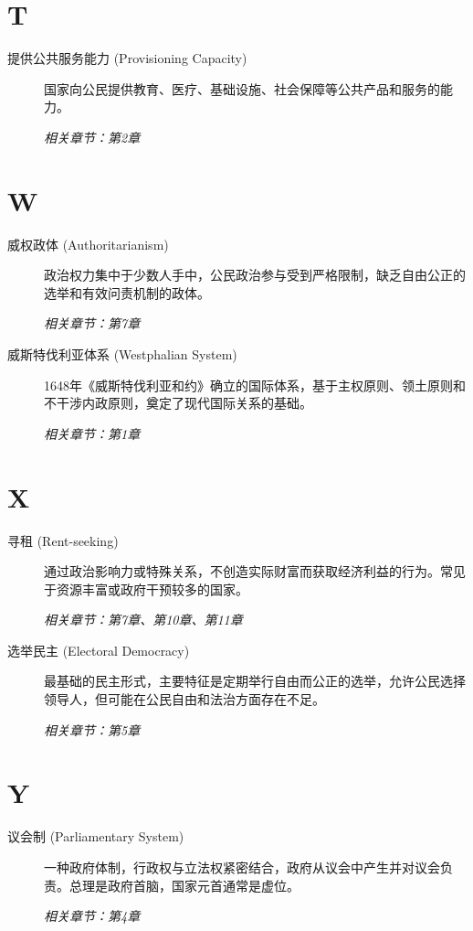\section{T}
\begin{description}
    \item[提供公共服务能力 (Provisioning Capacity)] 国家向公民提供教育、医疗、基础设施、社会保障等公共产品和服务的能力。 \par\textit{相关章节：第2章}
\end{description}

\section{W}
\begin{description}
    \item[威权政体 (Authoritarianism)] 政治权力集中于少数人手中，公民政治参与受到严格限制，缺乏自由公正的选举和有效问责机制的政体。 \par\textit{相关章节：第7章}
    \item[威斯特伐利亚体系 (Westphalian System)] 1648年《威斯特伐利亚和约》确立的国际体系，基于主权原则、领土原则和不干涉内政原则，奠定了现代国际关系的基础。 \par\textit{相关章节：第1章}
\end{description}

\section{X}
\begin{description}
    \item[寻租 (Rent-seeking)] 通过政治影响力或特殊关系，不创造实际财富而获取经济利益的行为。常见于资源丰富或政府干预较多的国家。 \par\textit{相关章节：第7章、第10章、第11章}
    \item[选举民主 (Electoral Democracy)] 最基础的民主形式，主要特征是定期举行自由而公正的选举，允许公民选择领导人，但可能在公民自由和法治方面存在不足。 \par\textit{相关章节：第5章}
\end{description}

\section{Y}
\begin{description}
    \item[议会制 (Parliamentary System)] 一种政府体制，行政权与立法权紧密结合，政府从议会中产生并对议会负责。总理是政府首脑，国家元首通常是虚位。 \par\textit{相关章节：第4章}
\end{description}

